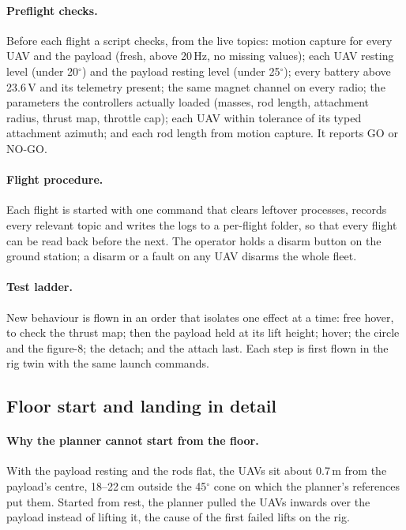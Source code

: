 \paragraph{Preflight checks.} Before each flight a script checks, from the live topics:
motion capture for every UAV and the payload (fresh, above 20\,Hz, no missing values); each UAV
resting level (under 20$^\circ$) and the payload resting level (under 25$^\circ$); every battery
above 23.6\,V and its telemetry present; the same magnet channel on every radio; the parameters the
controllers actually loaded (masses, rod length, attachment radius, thrust map, throttle cap);
each UAV within tolerance of its typed attachment azimuth; and each rod length from motion capture.
It reports GO or NO-GO.

\paragraph{Flight procedure.} Each flight is started with one command that clears leftover
processes, records every relevant topic and writes the logs to a per-flight folder, so that every
flight can be read back before the next. The operator holds a disarm button on the ground station;
a disarm or a fault on any UAV disarms the whole fleet.

\paragraph{Test ladder.} New behaviour is flown in an order that isolates one effect at a time:
free hover, to check the thrust map; then the payload held at its lift height; hover; the circle and
the figure-8; the detach; and the attach last. Each step is first flown in the rig twin with the
same launch commands.

\subsection{Floor start and landing in detail}
\label{sec:app_floor}

\paragraph{Why the planner cannot start from the floor.} With the payload resting and the rods flat,
the UAVs sit about 0.7\,m from the payload's centre, 18--22\,cm outside the 45$^\circ$ cone on which the
planner's references put them. Started from rest, the planner pulled the UAVs inwards over the payload
instead of lifting it, the cause of the first failed lifts on the rig.

